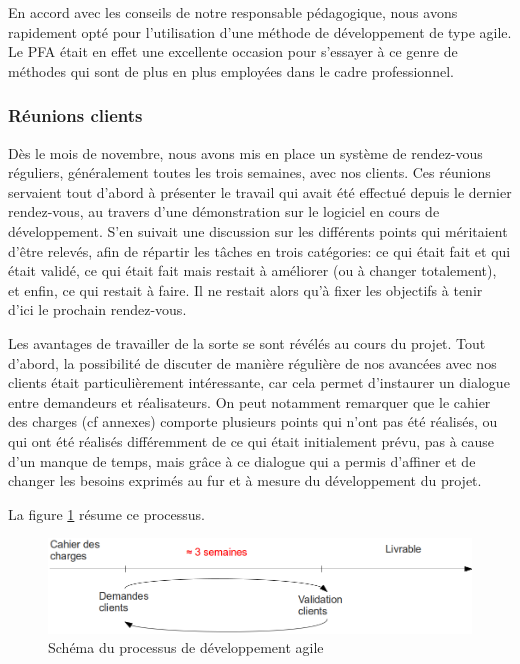 En accord avec les conseils de notre responsable pédagogique, nous avons rapidement opté pour l'utilisation d'une méthode de développement de type agile. Le PFA était en effet une excellente occasion pour s'essayer à ce genre de méthodes qui sont de plus en plus employées dans le cadre professionnel.

\subsubsection{Réunions clients}

Dès le mois de novembre, nous avons mis en place un système de rendez-vous réguliers, généralement toutes les trois semaines, avec nos clients. Ces réunions servaient tout d'abord à présenter le travail qui avait été effectué depuis le dernier rendez-vous, au travers d'une démonstration sur le logiciel en cours de développement. S'en suivait une discussion sur les différents points qui méritaient d'être relevés, afin de répartir les tâches en trois catégories: ce qui était fait et qui était validé, ce qui était fait mais restait à améliorer (ou à changer totalement), et enfin, ce qui restait à faire. Il ne restait alors qu'à fixer les objectifs à tenir d'ici le prochain rendez-vous.

Les avantages de travailler de la sorte se sont révélés au cours du projet. Tout d'abord, la possibilité de discuter de manière régulière de nos avancées avec nos clients était particulièrement intéressante, car cela permet d'instaurer un dialogue entre demandeurs et réalisateurs. On peut notamment remarquer que le cahier des charges (cf annexes) comporte plusieurs points qui n'ont pas été réalisés, ou qui ont été réalisés différemment de ce qui était initialement prévu, pas à cause d'un manque de temps, mais grâce à ce dialogue qui a permis d'affiner et de changer les besoins exprimés au fur et à mesure du développement du projet.

La figure \ref{agile} résume ce processus.

\begin{figure}[H]
\begin{center}
\includegraphics[width=450px]{methode_agile.png}
\caption{Schéma du processus de développement agile}
\label{agile}
\end{center}
\end{figure}

